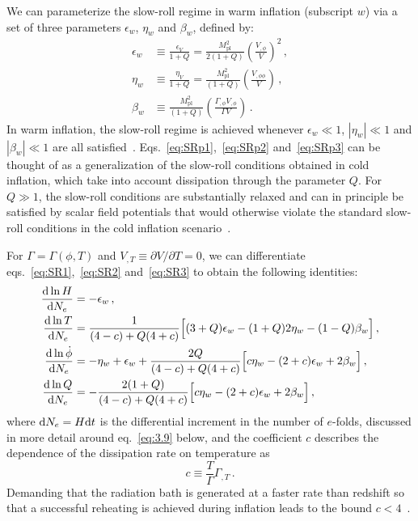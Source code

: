\documentclass[a4paper,11pt]{article}
\begin{document}
We can parameterize the slow-roll regime in warm inflation (subscript ${w}$) via a set of three parameters $\epsilon_{w}$, $\eta_{w}$ and $\beta_{w}$, defined by:
\begin{align}
\epsilon_{w} & \equiv \frac{\epsilon_{V}}{1+Q}=\frac{M_{\mathrm{pl}}^{2}}{2(1+Q)}\left(\frac{V_{, \phi}}{V}\right)^{2}\,, \label{eq:SRp1} \\
\eta_{w} & \equiv \frac{\eta_{V}}{1+Q}=\frac{M_{\mathrm{pl}}^{2}}{(1+Q)}\left(\frac{V_{, \phi \phi}}{V}\right)\,, \label{eq:SRp2} \\
\beta_{w} & \equiv \frac{M_{\mathrm{pl}}^{2}}{(1+Q)}\left(\frac{\Gamma_{, \phi} V_{, \phi}}{\Gamma V}\right) \label{eq:SRp3}\,.
\end{align}
In warm inflation, the slow-roll regime is achieved whenever $\epsilon_w \ll 1$, $|\eta_w| \ll 1$ and $|\beta_w| \ll 1$ are all satisfied~\cite{Taylor:2000ze, Hall:2003zp, Bastero-Gil:2004oun, Moss:2008yb}. Eqs.~\eqref{eq:SRp1},~\eqref{eq:SRp2} and~\eqref{eq:SRp3} can be thought of as a generalization of the slow-roll conditions obtained in cold inflation, which take into account dissipation through the parameter $Q$. For $Q\gg 1$, the slow-roll conditions are substantially relaxed and can in principle be satisfied by scalar field potentials that would otherwise violate the standard slow-roll conditions in the cold inflation scenario~\cite{Motaharfar:2018zyb,Das:2020xmh,Kamali:2021ugx,Santos:2022exm}. 

For $\Gamma=\Gamma(\phi, T)$ and $V_{,T} \equiv \partial V/\partial T =0$, we can differentiate eqs.~\eqref{eq:SR1},~\eqref{eq:SR2} and~\eqref{eq:SR3} to obtain the following identities:
\begin{align}
    \frac{{\rm d}\ln H}{{\rm d}N_e}&=-\epsilon_w\,, \label{eq:d1} \\
    \frac{{\rm d}\ln T}{{\rm d}N_e}&=\frac{1}{(4-c)+Q(4+c)}\Big[(3+Q)\epsilon_w-(1+Q)2\eta_w- (1-Q)\beta_w\Big]\,, \label{eq:d2} \\
    \frac{{\rm d}\ln \Dot{\phi}}{{\rm d}N_e}&=-\eta_w+\epsilon_w+\frac{2Q}{(4-c)+Q(4+c)}\Big[c\eta_w- (2+c)\epsilon_w+ 2\beta_w\Big]\,, \label{eq:d3} \\
    \frac{{\rm d}\ln Q}{{\rm d}N_e}&= -\frac{2(1+Q)}{(4-c)+Q(4+c)}\Big[c\eta_w- (2+c)\epsilon_w + 2\beta_w\Big]\,, \label{eq:d4} 
\end{align}
where ${\rm d}N_e=H{\rm d}t$ is the differential increment in the number of $e$-folds, discussed in more detail around eq.~\eqref{eq:3.9} below, and the coefficient $c$ describes the dependence of the dissipation rate on temperature as
\begin{equation}
    \label{def:c}
    c \equiv \frac{T}{\Gamma}\Gamma_{,T}\,.
\end{equation}
Demanding that the radiation bath is generated at a faster rate than redshift so that a successful reheating is achieved during inflation leads to the bound $c < 4$~\cite{Bastero-Gil:2011rva}.
\end{document}
